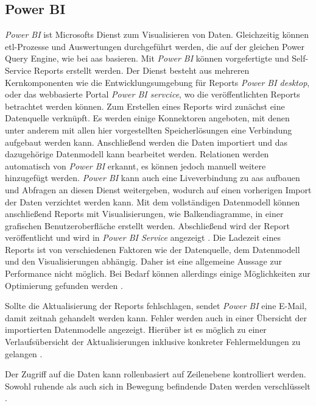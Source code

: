 \subsection{Power BI} \label{sec:grundlagen:azure_dienste:powerBI}
\textit{Power BI} ist Microsofts Dienst zum Visualisieren von Daten. Gleichzeitig können \ac{etl}-Prozesse und Auswertungen durchgeführt werden, die auf der gleichen Power Query Engine, wie bei \ac{aas} basieren. Mit \textit{Power BI} können vorgefertigte und Self-Service Reports erstellt werden. Der Dienst besteht aus mehreren Kernkomponenten wie die Entwicklungsumgebung für Reports \textit{Power BI desktop}, oder das webbasierte Portal \textit{Power BI servcice}, wo die veröffentlichten Reports betrachtet werden können. Zum Erstellen eines Reports wird zunächst eine Datenquelle verknüpft. Es werden einige Konnektoren angeboten, mit denen unter anderem mit allen hier vorgestellten Speicherlösungen eine Verbindung aufgebaut werden kann. Anschließend werden die Daten importiert und das dazugehörige Datenmodell kann bearbeitet werden. Relationen werden automatisch von \textit{Power BI} erkannt, es können jedoch manuell weitere hinzugefügt werden. \textit{Power BI} kann auch eine Liveverbindung zu \ac{aas} aufbauen und Abfragen an diesen Dienst weitergeben, wodurch auf einen vorherigen Import der Daten verzichtet werden kann. Mit dem vollständigen Datenmodell können anschließend Reports mit Visualisierungen, wie Balkendiagramme, in einer grafischen Benutzeroberfläche erstellt werden. Abschließend wird der Report veröffentlicht und wird in \textit{Power BI Service} angezeigt \cite{how_beyond_2020}. Die Ladezeit eines Reports ist von verschiedenen Faktoren wie der Datenquelle, dem Datenmodell und den Visualisierungen abhängig. Daher ist eine allgemeine Aussage zur Performance nicht möglich. Bei Bedarf können allerdings einige Möglichkeiten zur Optimierung gefunden werden \cite[vgl.][]{myers_optimization_2021}.

Sollte die Aktualisierung der Reports fehlschlagen, sendet \textit{Power BI} eine E-Mail, damit zeitnah gehandelt werden kann. Fehler werden auch in einer Übersicht der importierten Datenmodelle angezeigt. Hierüber ist es möglich zu einer Verlaufsübersicht der Aktualisierungen inklusive konkreter Fehlermeldungen zu gelangen \cite{iseminger_data_2021}.

Der Zugriff auf die Daten kann rollenbasiert auf Zeilenebene kontrolliert werden. Sowohl ruhende als auch sich in Bewegung befindende Daten werden verschlüsselt \cite{inbar_power_2021}.

